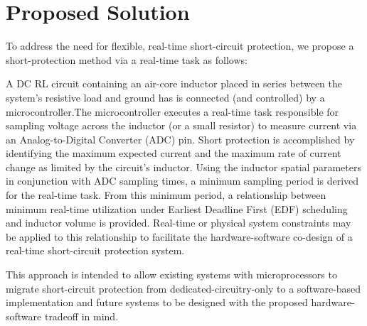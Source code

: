 \documentclass[11pt,oneside]{report}
\begin{document}
    \section{Proposed Solution}
    To address the need for flexible, real-time short-circuit protection, we propose a short-protection method via a real-time task as follows:
    
    A DC RL circuit containing an air-core inductor placed in series between the system's resistive load and ground has is connected (and controlled) by a microcontroller.The microcontroller executes a real-time task responsible for sampling voltage across the inductor (or a small resistor) to measure current via an Analog-to-Digital Converter (ADC) pin. Short protection is accomplished by identifying the maximum expected current and the maximum rate of current change as limited by the circuit's inductor. Using the inductor spatial parameters in conjunction with ADC sampling times, a minimum sampling period is derived for the real-time task. From this minimum period, a relationship between minimum real-time utilization under Earliest Deadline First (EDF) scheduling and inductor volume  is provided. Real-time or physical system constraints may be applied to this relationship to facilitate the hardware-software co-design of a real-time short-circuit protection system.
    
    This approach is intended to allow existing systems with microprocessors to migrate short-circuit protection from dedicated-circuitry-only to a software-based implementation and future systems to be designed with the proposed hardware-software tradeoff in mind.
    
\end{document}
